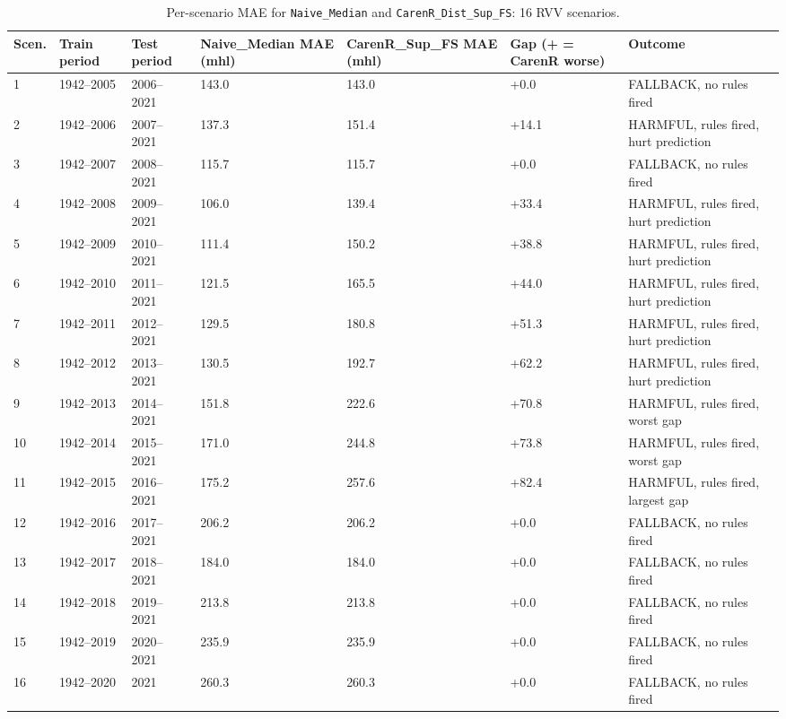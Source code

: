 \begin{table}[htbp]
  \centering
  \caption{Per-scenario MAE for \texttt{Naive\_Median} and \texttt{CarenR\_Dist\_Sup\_FS}: 16 RVV scenarios.}\label{tab:ch5b_2}
  \small
  \begin{adjustbox}{max width=\textwidth}
    \begin{tabularx}{\textwidth}{p{0.7cm}|p{1.6cm}|p{1.6cm}|p{1.5cm}|p{1.5cm}|p{1.6cm}|X}
  \toprule
  Scen. & Train period & Test period & Naive\_Median
MAE (mhl) & CarenR\_Sup\_FS
MAE (mhl) & Gap
(+ = CarenR worse) & Outcome \\
  \midrule
  1 & 1942--2005 & 2006--2021 & 143.0 & 143.0 & +0.0 & FALLBACK, no rules fired \\
  2 & 1942--2006 & 2007--2021 & 137.3 & 151.4 & +14.1 & HARMFUL, rules fired, hurt prediction \\
  3 & 1942--2007 & 2008--2021 & 115.7 & 115.7 & +0.0 & FALLBACK, no rules fired \\
  4 & 1942--2008 & 2009--2021 & 106.0 & 139.4 & +33.4 & HARMFUL, rules fired, hurt prediction \\
  5 & 1942--2009 & 2010--2021 & 111.4 & 150.2 & +38.8 & HARMFUL, rules fired, hurt prediction \\
  6 & 1942--2010 & 2011--2021 & 121.5 & 165.5 & +44.0 & HARMFUL, rules fired, hurt prediction \\
  7 & 1942--2011 & 2012--2021 & 129.5 & 180.8 & +51.3 & HARMFUL, rules fired, hurt prediction \\
  8 & 1942--2012 & 2013--2021 & 130.5 & 192.7 & +62.2 & HARMFUL, rules fired, hurt prediction \\
  9 & 1942--2013 & 2014--2021 & 151.8 & 222.6 & +70.8 & HARMFUL, rules fired, worst gap \\
  10 & 1942--2014 & 2015--2021 & 171.0 & 244.8 & +73.8 & HARMFUL, rules fired, worst gap \\
  11 & 1942--2015 & 2016--2021 & 175.2 & 257.6 & +82.4 & HARMFUL, rules fired, largest gap \\
  12 & 1942--2016 & 2017--2021 & 206.2 & 206.2 & +0.0 & FALLBACK, no rules fired \\
  13 & 1942--2017 & 2018--2021 & 184.0 & 184.0 & +0.0 & FALLBACK, no rules fired \\
  14 & 1942--2018 & 2019--2021 & 213.8 & 213.8 & +0.0 & FALLBACK, no rules fired \\
  15 & 1942--2019 & 2020--2021 & 235.9 & 235.9 & +0.0 & FALLBACK, no rules fired \\
  16 & 1942--2020 & 2021 & 260.3 & 260.3 & +0.0 & FALLBACK, no rules fired \\
  \bottomrule
\end{tabularx}
  \end{adjustbox}

\end{table}



